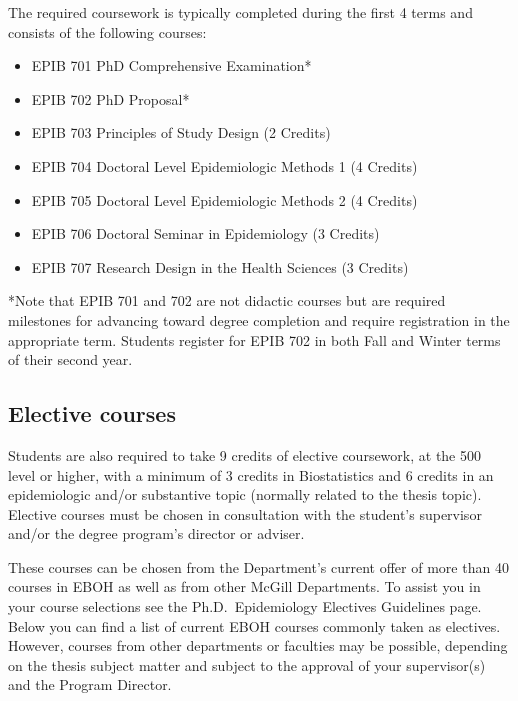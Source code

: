\documentclass[
]{book}
\providecommand{\tightlist}{%
  \setlength{\itemsep}{0pt}\setlength{\parskip}{0pt}}
\begin{document}
The required coursework is typically completed during the first 4 terms and consists of the following courses:

\begin{itemize}
\tightlist
\item
  EPIB 701 PhD Comprehensive Examination*
\item
  EPIB 702 PhD Proposal*
\item
  EPIB 703 Principles of Study Design (2 Credits)
\item
  EPIB 704 Doctoral Level Epidemiologic Methods 1 (4 Credits)
\item
  EPIB 705 Doctoral Level Epidemiologic Methods 2 (4 Credits)
\item
  EPIB 706 Doctoral Seminar in Epidemiology (3 Credits)
\item
  EPIB 707 Research Design in the Health Sciences (3 Credits)
\end{itemize}

*Note that EPIB 701 and 702 are not didactic courses but are required milestones for advancing toward degree completion and require registration in the appropriate term. Students register for EPIB 702 in both Fall and Winter terms of their second year.

\hypertarget{elective-courses-1}{%
\subsection{Elective courses}\label{elective-courses-1}}

Students are also required to take 9 credits of elective coursework, at the 500 level or higher, with a minimum of 3 credits in Biostatistics and 6 credits in an epidemiologic and/or substantive topic (normally related to the thesis topic). Elective courses must be chosen in consultation with the student's supervisor and/or the degree program's director or adviser.

These courses can be chosen from the Department's current offer of more than 40 courses in EBOH as well as from other McGill Departments. To assist you in your course selections see the Ph.D.~Epidemiology Electives Guidelines page. Below you can find a list of current EBOH courses commonly taken as electives. However, courses from other departments or faculties may be possible, depending on the thesis subject matter and subject to the approval of your supervisor(s) and the Program Director.
\end{document}
